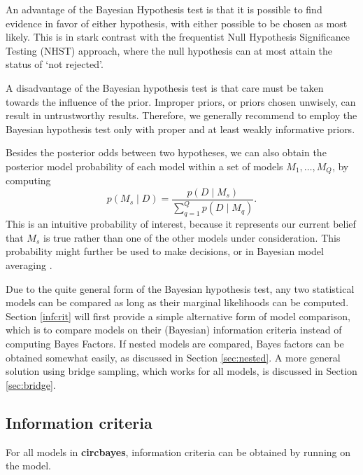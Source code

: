 \documentclass{article}
\newcommand{\code}[1]{\texttt{\detokenize{#1}}}
\newcommand{\pkg}[1]{\textbf{#1}}
\begin{document}
An advantage of the Bayesian Hypothesis test is that it is possible to
find evidence in favor of either hypothesis, with either possible to be
chosen as most likely. This is in stark contrast with the frequentist
Null Hypothesis Significance Testing (NHST) approach, where the null
hypothesis can at most attain the status of `not rejected'.

A disadvantage of the Bayesian hypothesis test is that care must be
taken towards the influence of the prior. Improper priors, or priors
chosen unwisely, can result in untrustworthy results. Therefore, we
generally recommend to employ the Bayesian hypothesis test only with
proper and at least weakly informative priors.

Besides the posterior odds between two hypotheses, we can also obtain
the posterior model probability of each model within a set of models
\(M_1, \dots, M_Q\), by computing \begin{equation}
p(M_s \mid D) = \frac{p(D \mid M_s)}{\sum_{q = 1}^Q p(D \mid M_q)}.
\end{equation} This is an intuitive probability of interest, because it
represents our current belief that \(M_s\) is true rather than one of
the other models under consideration. This probability might further be
used to make decisions, or in Bayesian model averaging
\citep{hoeting1999bayesian, bao2010bias}.

Due to the quite general form of the Bayesian hypothesis test, any two
statistical models can be compared as long as their marginal likelihoods
can be computed. Section \ref{infcrit} will first provide a simple
alternative form of model comparison, which is to compare models on
their (Bayesian) information criteria \citep[Ch. 7]{gelman2003bayesian}
instead of computing Bayes Factors. If nested models are compared, Bayes
factors can be obtained somewhat easily, as discussed in Section
\ref{sec:nested}. A more general solution using bridge sampling, which
works for all models, is discussed in Section \ref{sec:bridge}.

\hypertarget{information-criteria}{%
	\subsection{Information criteria}\label{information-criteria}}

\label{infcrit}

For all models in \pkg{circbayes}, information criteria can be obtained
by running \code{inf_crit()} on the model.
\end{document}
